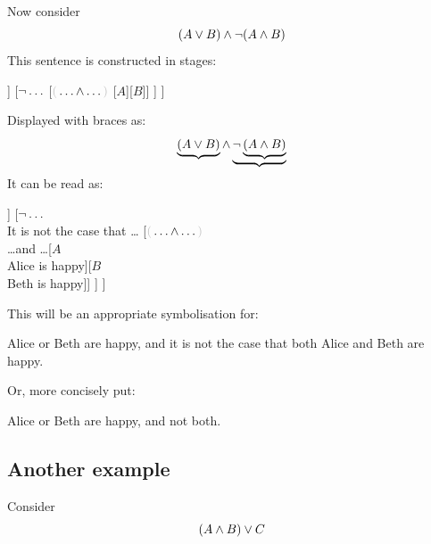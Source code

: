 Now consider 
$$(A\vee B)\mathbin{\wedge} \neg(A\mathbin{\wedge} B)$$
This sentence is constructed in stages: 
\begin{center}
	\begin{forest}
		[$\almostinvisibleopenbracket\ldots\eand\ldots\almostinvisibleclosebracket$
		[$\almostinvisibleopenbracket\ldots{\eor} \ldots\almostinvisibleclosebracket$[$A$][$B$]]
		[${\neg}\ldots$
		[$\almostinvisibleopenbracket\ldots{\eand} \ldots\almostinvisibleclosebracket$ [$A$][$B$]]
		]
		]
	\end{forest}
\end{center}
Displayed with braces as:
$$\underbrace{(A\vee B)}\mathbin{\wedge} \underbrace{\neg\underbrace{(A\mathbin{\wedge} B)}}$$
It can be read as:
\begin{center}
	\begin{forest}
		[$\almostinvisibleopenbracket\ldots\eand\ldots\almostinvisibleclosebracket$\\\ldots and \ldots
		[$\almostinvisibleopenbracket\ldots{\eor} \ldots\almostinvisibleclosebracket$\\\ldots or \ldots[$A$\\Alice is happy][$B$\\Beth is happy]]
		[${\neg}\ldots$\\It is not the case that \ldots
		[$\almostinvisibleopenbracket\ldots{\eand} \ldots\almostinvisibleclosebracket$\\\ldots and \ldots [$A$\\Alice is happy][$B$\\Beth is happy]]
		]
		]
	\end{forest}
\end{center}
This will be an appropriate symbolisation for: 
\begin{samplesent}
\item	Alice or Beth are happy, and it is not the case that both Alice and Beth are happy.
\end{samplesent}
Or, more concisely put:
\begin{samplesent}
	\item Alice or Beth are happy, and not both. 
\end{samplesent}


\subsection{Another example}
Consider $$(A\mathbin{\wedge} B)\vee C$$

